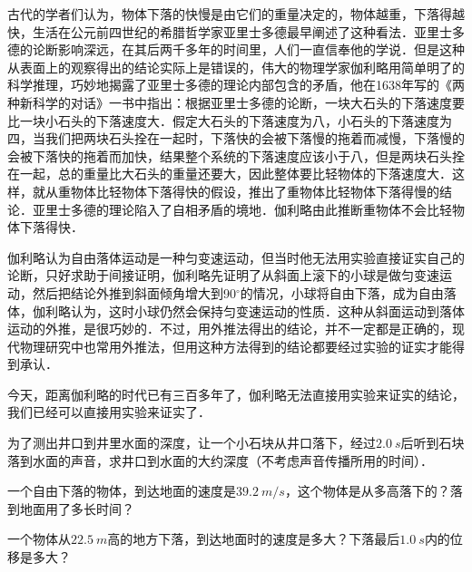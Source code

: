 \begin{History}[伽利略对自由落体的研究]
古代的学者们认为，物体下落的快慢是由它们的重量决定的，物体越重，下落得越快，生活在公元前四世纪的希腊哲学家亚里士多德最早阐述了这种看法．亚里士多德的论断影响深远，在其后两千多年的时间里，人们一直信奉他的学说．但是这种从表面上的观察得出的结论实际上是错误的，伟大的物理学家伽利略用简单明了的科学推理，巧妙地揭露了亚里士多德的理论内部包含的矛盾，他在1638年写的《两种新科学的对话》一书中指出：根据亚里士多德的论断，一块大石头的下落速度要比一块小石头的下落速度大．假定大石头的下落速度为八，小石头的下落速度为四，当我们把两块石头拴在一起时，下落快的会被下落慢的拖着而减慢，下落慢的会被下落快的拖着而加快，结果整个系统的下落速度应该小于八，但是两块石头拴在一起，总的重量比大石头的重量还要大，因此整体要比轻物体的下落速度大．这样，就从重物体比轻物体下落得快的假设，推出了重物体比轻物体下落得慢的结论．亚里士多德的理论陷入了自相矛盾的境地．伽利略由此推断重物体不会比轻物体下落得快．

伽利略认为自由落体运动是一种匀变速运动，但当时他无法用实验直接证实自己的论断，只好求助于间接证明，伽利略先证明了从斜面上滚下的小球是做匀变速运动，然后把结论外推到斜面倾角增大到90$^\circ$的情况，小球将自由下落，成为自由落体，伽利略认为，这时小球仍然会保持匀变速运动的性质．这种从斜面运动到落体运动的外推，是很巧妙的．不过，用外推法得出的结论，并不一定都是正确的，现代物理研究中也常用外推法，但用这种方法得到的结论都要经过实验的证实才能得到承认．

今天，距离伽利略的时代已有三百多年了，伽利略无法直接用实验来证实的结论，我们已经可以直接用实验来证实了．

\end{History}



\begin{Exercise}
	\begin{QsNum}
	    \item 为了测出井口到井里水面的深度，让一个小石块从井口落下，经过$\qty{2.0}{s}$后听到石块落到水面的声音，求井口到水面的大约深度（不考虑声音传播所用的时间）．
	    \item 一个自由下落的物体，到达地面的速度是$\qty{39.2}{m/s}$，这个物体是从多高落下的？落到地面用了多长时间？
	    \item 一个物体从$\qty{22.5}{m}$高的地方下落，到达地面时的速度是多大？下落最后$\qty{1.0}{s}$内的位移是多大？
    \end{QsNum}
\end{Exercise}





